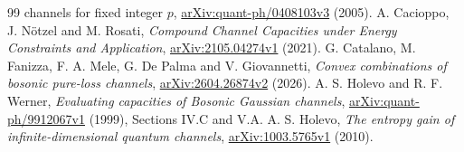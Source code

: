 \documentclass[11pt]{article}
\begin{document}
\begin{thebibliography}{99}
{channels for fixed integer $p$},
\href{https://arxiv.org/abs/quant-ph/0408103v3}{arXiv:quant-ph/0408103v3} (2005).
 A. Cacioppo, J. N\"otzel and M. Rosati,
\emph{Compound Channel Capacities under Energy Constraints and Application},
\href{https://arxiv.org/abs/2105.04274v1}{arXiv:2105.04274v1} (2021).
 G. Catalano, M. Fanizza, F. A. Mele, G. De Palma and
V. Giovannetti, \emph{Convex combinations of bosonic pure-loss channels},
\href{https://arxiv.org/abs/2604.26874v2}{arXiv:2604.26874v2} (2026).
 A. S. Holevo and R. F. Werner,
\emph{Evaluating capacities of Bosonic Gaussian channels},
\href{https://arxiv.org/abs/quant-ph/9912067v1}
{arXiv:quant-ph/9912067v1} (1999), Sections IV.C and V.A.
 A. S. Holevo,
\emph{The entropy gain of infinite-dimensional quantum channels},
\href{https://arxiv.org/abs/1003.5765v1}{arXiv:1003.5765v1} (2010).
\end{thebibliography}
\end{document}
